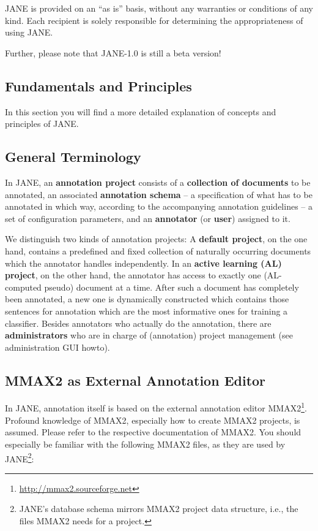 \documentclass[DIV12,english,11pt,halfparskip]{scrartcl}
\begin{document}
JANE is provided on an ``as is'' basis, without any warranties or
conditions of any kind. Each recipient is solely responsible for
determining the appropriateness of using JANE.

Further, please note that JANE-1.0 is still a beta version!








 \newpage
\begin{appendix}
\appendix

\setcounter{figure}{0}
\section{Fundamentals and Principles}
\label{appendix:terminology}

In this section you will find a more detailed explanation of concepts
and principles of JANE.

\subsection{General Terminology}

In JANE, an \textbf{annotation project} consists of a
\textbf{collection of documents} to be annotated, an associated
\textbf{annotation schema} -- a specification of what has to be
annotated in which way, according to the accompanying annotation
guidelines -- a set of configuration parameters, and an
\textbf{annotator} (or \textbf{user}) assigned to it. 

We distinguish two kinds of annotation projects: A \textbf{default
  project}, on the one hand, contains a predefined and fixed
collection of naturally occurring documents which the annotator
handles independently. In an \textbf{active learning
  (AL) project}, on the other hand, the annotator has access to
exactly one (AL-computed pseudo) document at a time. After such a
document has completely been annotated, a new one is dynamically
constructed which contains those sentences for annotation which are
the most informative ones for training a classifier.  Besides
annotators who actually do the annotation, there are
\textbf{administrators} who are in charge of (annotation) project
management (see administration GUI howto).


\subsection{MMAX2 as External Annotation Editor}
In JANE, annotation itself is based on the external annotation editor
MMAX2\footnote{\url{http://mmax2.sourceforge.net}}. Profound knowledge
of MMAX2, especially how to create MMAX2 projects,\index{} is assumed.
Please refer to the respective documentation of MMAX2.  You should
especially be familiar with the following MMAX2 files, as they are
used by JANE\footnote{JANE's database schema mirrors MMAX2 project
  data structure, i.e., the files MMAX2 needs for a project.}:


\end{appendix}
\end{document}
